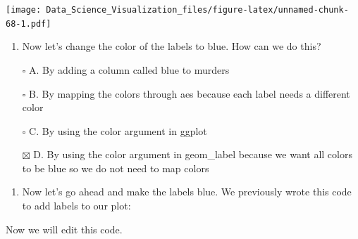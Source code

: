 \documentclass[
]{article}
\newenvironment{Shaded}{\begin{snugshade}}{\end{snugshade}}
\newcommand{\DataTypeTok}[1]{\textcolor[rgb]{0.13,0.29,0.53}{#1}}
\newcommand{\KeywordTok}[1]{\textcolor[rgb]{0.13,0.29,0.53}{\textbf{#1}}}
\newcommand{\NormalTok}[1]{#1}
\newcommand{\OperatorTok}[1]{\textcolor[rgb]{0.81,0.36,0.00}{\textbf{#1}}}
\newcommand{\StringTok}[1]{\textcolor[rgb]{0.31,0.60,0.02}{#1}}
\providecommand{\tightlist}{%
  \setlength{\itemsep}{0pt}\setlength{\parskip}{0pt}}
\begin{document}
\texttt{[image: Data\_Science\_Visualization\_files/figure-latex/unnamed-chunk-68-1.pdf]}

\begin{enumerate}
\def\labelenumi{\arabic{enumi}.}
\setcounter{enumi}{8}
\tightlist
\item
  Now let's change the color of the labels to blue. How can we do this?
\end{enumerate}

\begin{itemize}
\tightlist
\item[$\square$]
  A. By adding a column called blue to murders
\item[$\square$]
  B. By mapping the colors through aes because each label needs a
  different color
\item[$\square$]
  C. By using the color argument in ggplot
\item[$\boxtimes$]
  D. By using the color argument in geom\_label because we want all
  colors to be blue so we do not need to map colors
\end{itemize}

\begin{enumerate}
\def\labelenumi{\arabic{enumi}.}
\setcounter{enumi}{9}
\tightlist
\item
  Now let's go ahead and make the labels blue. We previously wrote this
  code to add labels to our plot:
\end{enumerate}

\begin{Shaded}
\end{Shaded}

Now we will edit this code.

\begin{Shaded}
\end{Shaded}
\end{document}
